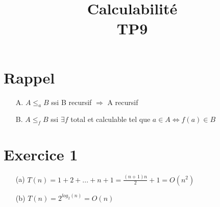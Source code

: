 \documentclass[a4paper, 11pt, onecolumn]{article}
\title{Calculabilité\\TP9}
\begin{document}
\maketitle

\section*{Rappel}
\begin{framed}
\begin{itemize}
\item[A.]$A \leq_a B$ ssi B recursif $\Rightarrow$ A recursif
\item[B.]$A \leq_f B$ ssi $\exists f$ total et calculable tel que $a \in A \Leftrightarrow f(a) \in B$
\end{itemize}
\end{framed}

\section*{Exercice 1}
\begin{itemize}
	\item[(a)] $T(n) = 1+2+...+n+1 = \frac{(n+1)n}{2}+1=O(n^2)$
	\item[(b)] $T(n) = 2^{log_2(n)} = O(n)$
\end{itemize}
\end{document}
